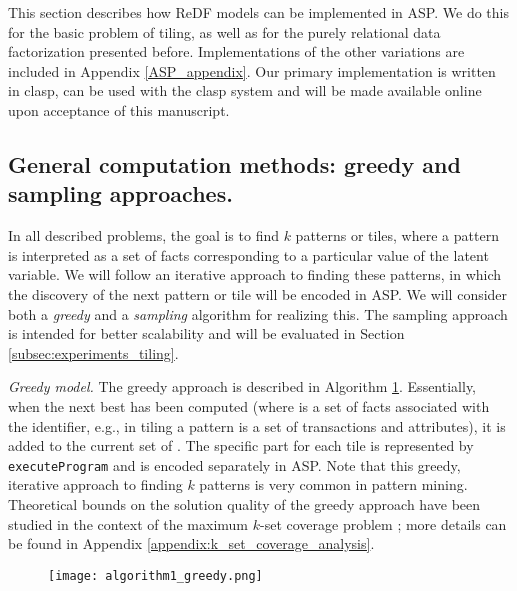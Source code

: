 This section describes how ReDF models can be implemented in ASP. We do this for the basic problem of tiling, as well as for the purely relational data factorization presented before. Implementations of the other variations are included in Appendix \ref{ASP_appendix}. Our primary implementation is written in clasp, can be used with the clasp system \parencite{ASPbook,BrewkaCACM} and will be made available online upon acceptance of this manuscript.

\subsection{General computation methods: greedy and sampling approaches.} 
In all described problems, the goal is to find $k$ patterns or tiles, where a pattern is interpreted as a set of facts corresponding to a particular value of the latent variable. 
We will follow an iterative approach to finding these patterns,
in which the discovery of the next pattern or tile will be encoded in ASP.
We will consider both a {\em greedy} and a {\em sampling} algorithm
for realizing this. The sampling approach is intended for better scalability and will
be evaluated in Section \ref{subsec:experiments_tiling}.

\textit{Greedy model.}
The greedy approach is described  in  Algorithm \ref{alg:greedy}. Essentially, 
when the next best \tile has been computed (where \tile is a set of facts associated with the \tile identifier, e.g., in tiling a pattern is a set of transactions and attributes), it is added to the current set of \tiles. The specific part for each tile is represented by \texttt{executeProgram} and is encoded separately in ASP. Note that this greedy, iterative approach to finding $k$ patterns is very common in pattern mining. 
\changesb Theoretical bounds on the solution quality of the greedy approach have been studied in the context of the maximum $k$-set coverage problem \parencite{max_k_set_cover1, max_k_set_cover2}; more details can be found in Appendix \ref{appendix:k_set_coverage_analysis}. \changese
\begin{figure}[thb]
\texttt{[image: algorithm1\_greedy.png]}
 \label{alg:greedy}
\end{figure}

